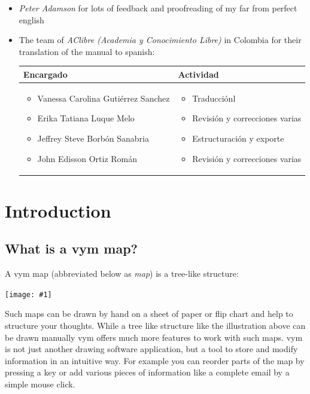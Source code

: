 \documentclass[12pt,a4paper]{article}
\newcommand{\maximage}[1]{  
    \begin{center}
        \texttt{[image: \#1]} 
    \end{center}
}
\newcommand{\vym}{{\sc vym }}
\begin{document}
\begin{itemize}
    \item {\em Peter Adamson} for lots of feedback and proofreading of my
          far from perfect english
    \item The team of {\em AClibre (Academia y Conocimiento Libre)}
          in Colombia for their translation of
          the manual to spanish:
          \begin{center}
            \begin{tabular}{|p{7cm}|p{5.5cm}|} \hline
                Encargado & Actividad \\ \hline
                \begin{itemize}
                   \item Vanessa Carolina Guti\'errez Sanchez
                   \item Erika Tatiana Luque Melo
                   \item Jeffrey Steve Borb\'on Sanabria
                   \item John Edisson Ortiz Rom\'an
                \end{itemize} &
                \begin{itemize}
                    \item Traducci\'onl
                    \item Revisi\'on y correcciones varias
                    \item Estructuraci\'on y exporte
                    \item Revisi\'on y correcciones varias
                \end{itemize}     \\ \hline
            \end{tabular}   
        \end{center}
\end{itemize}
\newpage


\section{Introduction}
\subsection{What is a \vym map?}
A \vym map (abbreviated below as {\em map}) is a tree-like structure:
\maximage{images/example1.png}
Such maps can be drawn by hand on a sheet of paper or flip chart and
help to structure your thoughts. While a tree like structure like the
illustration above can be drawn manually \vym offers much more features
to work with such maps.  \vym is not just another drawing software
application, but a tool to store and modify information in an intuitive
way. For example you can reorder parts of the map by pressing a key or
add various pieces of information like a complete email by a simple
mouse click.
\end{document}
